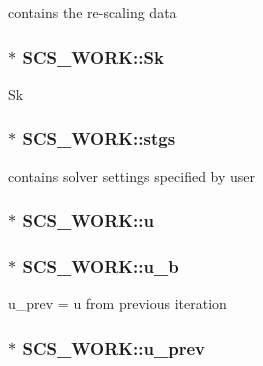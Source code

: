 contains the re-\/scaling data \hypertarget{struct_s_c_s___w_o_r_k_a7cca350a27cb51159173625c33c612a8}{
\subsubsection[{Sk}]{$\ast$ S\-C\-S\-\_\-\-W\-O\-R\-K\-::\-Sk}}\label{struct_s_c_s___w_o_r_k_a7cca350a27cb51159173625c33c612a8}
Sk \hypertarget{struct_s_c_s___w_o_r_k_a4f48ab97dacf5c54b250752d2213c83c}{
\subsubsection[{stgs}]{$\ast$ S\-C\-S\-\_\-\-W\-O\-R\-K\-::stgs}}\label{struct_s_c_s___w_o_r_k_a4f48ab97dacf5c54b250752d2213c83c}
contains solver settings specified by user \hypertarget{struct_s_c_s___w_o_r_k_a991bc82cd3e84ce1ac7d3625b051a577}{
\subsubsection[{u}]{$\ast$ S\-C\-S\-\_\-\-W\-O\-R\-K\-::u}}\label{struct_s_c_s___w_o_r_k_a991bc82cd3e84ce1ac7d3625b051a577}
\hypertarget{struct_s_c_s___w_o_r_k_add22e29c01511a45f085a438a2c8efd5}{
\subsubsection[{u\-\_\-b}]{$\ast$ S\-C\-S\-\_\-\-W\-O\-R\-K\-::u\-\_\-b}}\label{struct_s_c_s___w_o_r_k_add22e29c01511a45f085a438a2c8efd5}
u\-\_\-prev = u from previous iteration \hypertarget{struct_s_c_s___w_o_r_k_af90331bf1e7921c168c0877ffe3b9144}{
\subsubsection[{u\-\_\-prev}]{$\ast$ S\-C\-S\-\_\-\-W\-O\-R\-K\-::u\-\_\-prev}}\label{struct_s_c_s___w_o_r_k_af90331bf1e7921c168c0877ffe3b9144}
